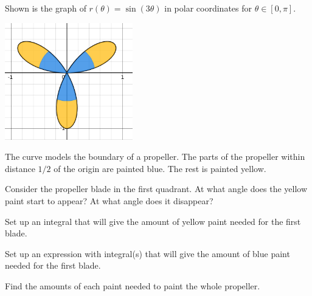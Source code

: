 \documentclass{workbook}
\begin{document}
\begin{slide}
	\question

		Shown is the graph of $\displaystyle
		r(\theta)=\sin(3\theta)
		$
		in polar coordinates
		for $\theta\in[0,\pi]$.
		\begin{center}
	\includegraphics[height=2in]{images/propeller-painted.png}
		\end{center}

	
	The curve models the boundary of a propeller. The parts of the propeller
	within distance $1/2$ of the origin are painted blue. The rest is painted yellow.

	\begin{parts}
		\item Consider the propeller blade in the first quadrant. At what
		angle does the yellow paint start to appear? At what angle does it 
		disappear?

		\item Set up an integral that will give the amount of yellow paint needed for the first blade.

		\item Set up an expression with integral(s) that will give the amount of blue paint needed
		for the first blade.

		\item Find the amounts of each paint needed to paint the 
		whole propeller.
	\end{parts}
\end{slide}
\end{document}
